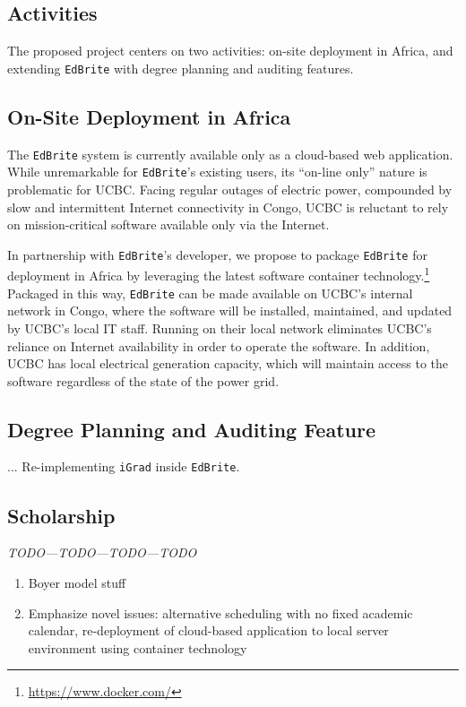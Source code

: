 \documentclass{article}
\newcommand{\igrad}{\texttt{iGrad}}
\newcommand{\edbrite}{\texttt{EdBrite}}
\begin{document}
\subsection{Activities}
\label{sec:activities}

The proposed project centers on two activities:
on-site deployment in Africa,
and extending \edbrite{} with degree planning and auditing features.

\subsection{On-Site Deployment in Africa}
\label{sec:on-site-deployment}

The \edbrite{} system is currently available only as a cloud-based web application.
While unremarkable for \edbrite's existing users,
its ``on-line only'' nature is problematic for UCBC.
Facing regular outages of electric power,
compounded by slow and intermittent
Internet connectivity in Congo,
UCBC is reluctant to rely on mission-critical software
available only via the Internet.

In partnership with \edbrite's developer,
we propose to package \edbrite{} 
for deployment in Africa
by leveraging the latest software container technology.\footnote{\url{https://www.docker.com/}}
Packaged in this way,
\edbrite{} can be made available
on UCBC's internal network in Congo,
where the software will be installed, maintained, and updated
by UCBC's local IT staff.
Running on their local network eliminates UCBC's reliance on Internet availability
in order to operate the software.
In addition, UCBC has local electrical generation capacity,
which will maintain access to the software
regardless of the state of the power grid.

\subsection{Degree Planning and Auditing Feature}
\label{sec:planning-auditing}

... Re-implementing \igrad{} inside \edbrite{}.


\subsection{Scholarship}
\label{sec:scholarship}

\emph{TODO---TODO---TODO---TODO}
\begin{enumerate}
\item Boyer model stuff
\item Emphasize novel issues: alternative scheduling with no fixed academic
  calendar, re-deployment of cloud-based application to local server
  environment using container technology
\end{enumerate}
\end{document}
